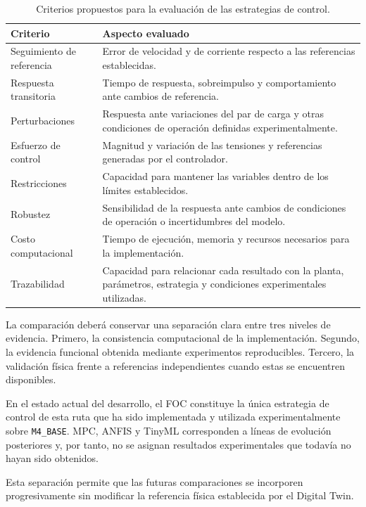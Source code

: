\begin{table}[H]
\centering
\caption{Criterios propuestos para la evaluación de las estrategias de control.}
\label{tab:criterios_control_avanzado}
\begin{tabular}{p{}p{}}
\toprule
\textbf{Criterio} & \textbf{Aspecto evaluado} \\
\midrule
Seguimiento de referencia &
Error de velocidad y de corriente respecto a las referencias establecidas. \\

Respuesta transitoria &
Tiempo de respuesta, sobreimpulso y comportamiento ante cambios de referencia. \\

Perturbaciones &
Respuesta ante variaciones del par de carga y otras condiciones de operación definidas experimentalmente. \\

Esfuerzo de control &
Magnitud y variación de las tensiones y referencias generadas por el controlador. \\

Restricciones &
Capacidad para mantener las variables dentro de los límites establecidos. \\

Robustez &
Sensibilidad de la respuesta ante cambios de condiciones de operación o incertidumbres del modelo. \\

Costo computacional &
Tiempo de ejecución, memoria y recursos necesarios para la implementación. \\

Trazabilidad &
Capacidad para relacionar cada resultado con la planta, parámetros, estrategia y condiciones experimentales utilizadas. \\
\bottomrule
\end{tabular}
\end{table}

La comparación deberá conservar una separación clara entre tres niveles de evidencia. Primero, la consistencia computacional de la implementación. Segundo, la evidencia funcional obtenida mediante experimentos reproducibles. Tercero, la validación física frente a referencias independientes cuando estas se encuentren disponibles.

En el estado actual del desarrollo, el FOC constituye la única estrategia de control de esta ruta que ha sido implementada y utilizada experimentalmente sobre \texttt{M4\_BASE}. MPC, ANFIS y TinyML corresponden a líneas de evolución posteriores y, por tanto, no se asignan resultados experimentales que todavía no hayan sido obtenidos.

Esta separación permite que las futuras comparaciones se incorporen progresivamente sin modificar la referencia física establecida por el Digital Twin.
